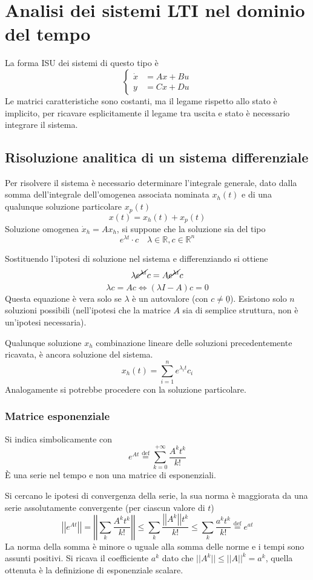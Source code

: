 \chapter{Analisi dei sistemi LTI nel dominio del tempo}
La forma ISU dei sistemi di questo tipo è
$$\left\{\begin{aligned}
\dot x &= Ax +Bu \\
y &= Cx + Du
\end{aligned}\right.$$
Le matrici caratteristiche sono costanti, ma il legame rispetto allo stato è
implicito, per ricavare esplicitamente il legame tra uscita e stato è necessario
integrare il sistema.

\section{Risoluzione analitica di un sistema differenziale}
Per risolvere il sistema è necessario determinare l'integrale generale, dato
dalla somma dell'integrale dell'omogenea associata
nominata $x_h(t)$ e di una qualunque soluzione particolare $x_p(t)$
$$
x(t) =x_h(t) + x_p(t)
$$
Soluzione omogenea $\dot x_h = Ax_h$, si suppone che la soluzione sia del tipo
$$
e^{\lambda t}\cdot c\quad \lambda \in \mathbb{R}, c\in \mathbb{R}^n
$$

Sostituendo l'ipotesi di soluzione nel sistema e differenziando si ottiene
$$
\lambda \cancel{e^{\lambda t}} c = A\cancel{e^{\lambda t}} c
$$
$$
\lambda c = A c \Leftrightarrow (\lambda I -A)c = 0
$$
Questa equazione è vera solo se $\lambda$ è un autovalore (con $c\neq
\underline{0}$).
Esistono solo $n$ soluzioni possibili (nell'ipotesi che la matrice $A$ sia di
semplice struttura, non è un'ipotesi necessaria).

Qualunque soluzione $x_h$ combinazione lineare delle soluzioni precedentemente
ricavata, è ancora soluzione del sistema.
$$
x_h(t) = \sum_{i=1}^n e^{\lambda_i t} c_i
$$
Analogamente si potrebbe procedere con la soluzione particolare.

\subsection{Matrice esponenziale}
Si indica simbolicamente con
\begin{equation}
e^{At} \stackrel{\text{def}}{=} \sum_{k=0}^{+\infty} \frac{A^k t^k}{k!}
\end{equation}
È una serie nel tempo e non una matrice di esponenziali.

Si cercano le ipotesi di convergenza della serie, la sua norma è maggiorata da
una serie assolutamente convergente (per ciascun valore di $t$)
$$
\left|\left|e^{At}\right|\right| = \left|\left|\sum_{k} \frac{A^k
t^k}{k!}\right|\right| \leq \sum_k \frac{\left|\left|A^k\right|\right| t^k}{k!}
\leq \sum_k \frac{a^kt^k}{k!} \stackrel{\text{def}}{=}e^{at}
$$
La norma della somma è minore o uguale alla somma delle norme e i tempi sono
assunti positivi.
Si ricava il coefficiente $a^k$ dato che $||A^k|| \leq ||A||^k = a^k $, quella
ottenuta è la definizione di esponenziale scalare.


